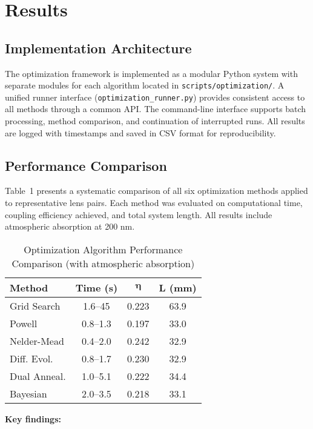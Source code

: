 \section{Results}

\subsection{Implementation Architecture}

The optimization framework is implemented as a modular Python system with separate modules for each algorithm located in \texttt{scripts/optimization/}. A unified runner interface (\texttt{optimization\_runner.py}) provides consistent access to all methods through a common API. The command-line interface supports batch processing, method comparison, and continuation of interrupted runs. All results are logged with timestamps and saved in CSV format for reproducibility.

\subsection{Performance Comparison}

Table~1 presents a systematic comparison of all six optimization methods applied to representative lens pairs. Each method was evaluated on computational time, coupling efficiency achieved, and total system length. All results include atmospheric absorption at 200 nm.

\begin{table}[h]
\centering
\caption{Optimization Algorithm Performance Comparison (with atmospheric absorption)}
\small
\begin{tabular}{lccc}
\hline
\textbf{Method} & \textbf{Time (s)} & \textbf{$\bm{\eta}$} & \textbf{$\bm{L}$ (mm)} \\
\hline
Grid Search & 1.6--45 & 0.223 & 63.9 \\
Powell & 0.8--1.3 & 0.197 & 33.0 \\
Nelder-Mead & 0.4--2.0 & 0.242 & 32.9 \\
Diff. Evol. & 0.8--1.7 & 0.230 & 32.9 \\
Dual Anneal. & 1.0--5.1 & 0.222 & 34.4 \\
Bayesian & 2.0--3.5 & 0.218 & 33.1 \\
\hline
\end{tabular}
\end{table}

\textbf{Key findings:}

